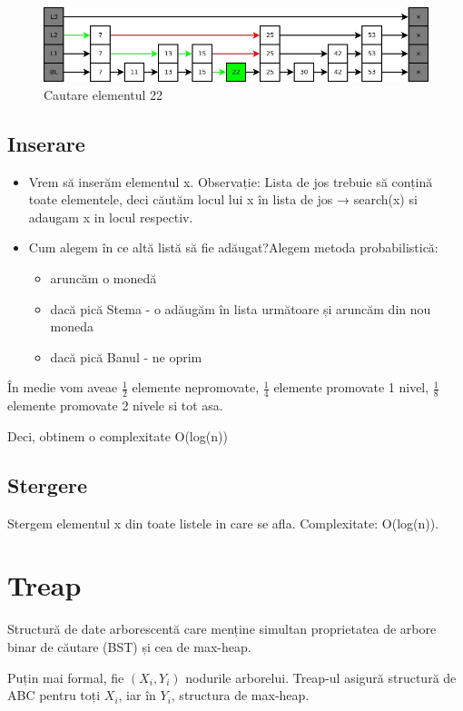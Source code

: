 \documentclass[11pt,a4paper]{article}
\theoremstyle{definition}
\theoremstyle{plain}
\theoremstyle{remark}
\begin{document}
\begin{figure}[H]
    \centering
    \includegraphics[width=0.75\linewidth]{skip-list-ex1.png}
    \caption{Cautare elementul 22}
    \label{fig:enter-label}
\end{figure}

\subsection*{Inserare}
\begin{itemize}
    \item Vrem să inserăm elementul x. Observație: Lista de jos trebuie să conțină toate elementele, deci căutăm locul lui x în lista de jos → search(x) si adaugam x in locul respectiv.
    \item Cum alegem în ce altă listă să ﬁe adăugat?Alegem metoda probabilistică:

    \begin{itemize}
        \item aruncăm o monedă
        \item  dacă pică Stema - o adăugăm în lista următoare și aruncăm din nou moneda
        \item dacă pică Banul - ne oprim
    \end{itemize}
\end{itemize}

În medie vom aveae $\frac{1}{2}$ elemente nepromovate, $\frac{1}{4}$ elemente promovate 1 nivel, $\frac{1}{8}$ elemente promovate 2 nivele si tot asa.

Deci, obtinem o complexitate O(log(n))

\subsection*{Stergere}
Stergem elementul x din toate listele in care se afla. Complexitate: O(log(n)).

\section{Treap}
Structură de date arborescentă care menține simultan proprietatea de arbore binar de căutare (BST) și cea de max-heap.

Puțin mai formal, fie $(X_{i}, Y_{i})$ nodurile arborelui. Treap-ul asigură structură de ABC pentru toți $X_i$, iar în $Y_i$, structura de max-heap.
\end{document}
